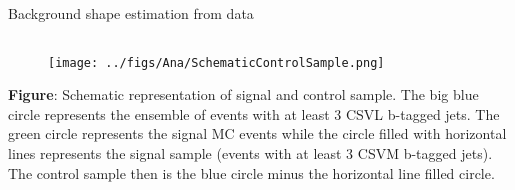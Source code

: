 \begin{frame}{Background shape estimation from data}
\begin{columns}
\begin{column}{.50\textwidth}
\begin{figure}[!Hhtbp]
  \begin{center}
    \texttt{[image: ../figs/Ana/SchematicControlSample.png]}
  \end{center}
\end{figure}

\vspace{-.2cm}
    \begin{block}{}\tiny
      \textbf{Figure}: Schematic representation of signal and control sample. The big blue circle represents the ensemble of events with at least 3 CSVL b-tagged jets. The green circle represents the signal MC events while the circle filled with horizontal lines represents the signal sample (events with at least 3 CSVM b-tagged jets). The control sample then is the blue circle minus the horizontal line filled circle.
    \end{block}
\end{column}

\end{columns}

\end{frame}

